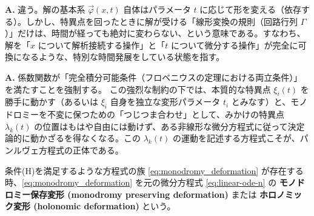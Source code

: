 \begin{Q}
\textbf{A.} 違う。解の基本系 $\vec{\varphi}(x, t)$ 自体はパラメータ $t$ に応じて形を変える（依存する）。しかし、特異点を回ったときに解が受ける「線形変換の規則（回路行列 $\Gamma$）」だけは、時間が経っても絶対に変わらない、という意味である。すなわち、解を「$x$ について解析接続する操作」と「$t$ について微分する操作」が完全に可換になるような、特別な時間発展をしている状態を指す。
\end{Q}

\begin{Q}
\textbf{A.} 係数関数が「完全積分可能条件（フロベニウスの定理における両立条件）」を満たすことを強制する。
この強烈な制約の下では、本質的な特異点 $\xi_i(t)$ を勝手に動かす（あるいは $\xi_i$ 自身を独立な変形パラメータ $t_i$ とみなす）と、モノドロミーを不変に保つための「つじつま合わせ」として、みかけの特異点 $\lambda_k(t)$ の位置はもはや自由には動けず、ある非線形な微分方程式に従って決定論的に動かざるを得なくなる。この $\lambda_k(t)$ の運動を記述する方程式こそが、パンルヴェ方程式の正体である。
\end{Q}

\begin{definition}[モノドロミー保存変形]
    条件(H)を満足するような方程式の族 \eqref{eq:monodromy_deformation} が存在する時、\eqref{eq:monodromy_deformation} を元の微分方程式 \eqref{eq:linear-ode-n} の \textbf{モノドロミー保存変形 (monodromy preserving deformation)} または \textbf{ホロノミック変形 (holonomic deformation)} という。
\end{definition}
